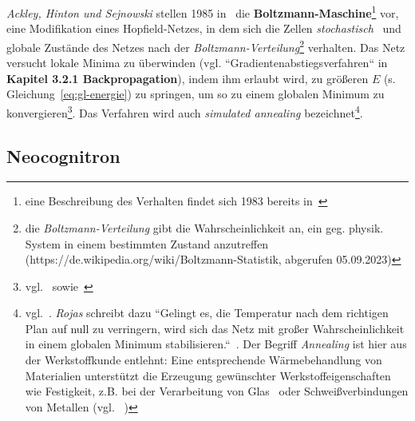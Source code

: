 \textit{Ackley, Hinton und Sejnowski} stellen 1985 in~\cite{AHS85} die \textbf{Boltzmann-Maschine}\footnote{
    eine Beschreibung des Verhalten findet sich 1983 bereits in~\cite{HS83}
} vor, eine Modifikation eines Hopfield-Netzes, in dem sich die Zellen \textit{stochastisch}~\cite[635]{AR88} und globale Zustände des Netzes nach der \textit{Boltzmann-Verteilung}\footnote{
    die \textit{Boltzmann-Verteilung} gibt die Wahrscheinlichkeit an, ein geg. physik. System in einem bestimmten Zustand anzutreffen (https://de.wikipedia.org/wiki/Boltzmann-Statistik, abgerufen  05.09.2023)
} verhalten. Das Netz versucht lokale Minima zu überwinden (vgl. ``Gradientenabstiegsverfahren`` in \textbf{Kapitel 3.2.1 Backpropagation}), indem ihm erlaubt wird, zu größeren $E$ (s. Gleichung~\ref{eq:gl-energie}) zu springen, um so zu einem globalen Minimum zu konvergieren\footnote{
    vgl.~\cite[151]{AHS85} sowie~\cite[107]{Koh90}
}.
Das Verfahren wird auch \textit{simulated annealing} bezeichnet\footnote{vgl.~\cite[297]{Ert21b}. \textit{Rojas} schreibt dazu
    ``Gelingt es, die Temperatur nach dem richtigen Plan auf null zu verringern, wird sich das Netz mit großer Wahrscheinlichkeit in einem globalen Minimum stabilisieren.``~\cite[322]{Roj93}. Der Begriff \textit{Annealing} ist hier aus der Werkstoffkunde entlehnt: Eine entsprechende Wärmebehandlung von Materialien unterstützt die Erzeugung gewünschter Werkstoffeigenschaften wie Festigkeit, z.B.  bei der Verarbeitung von Glas~\cite[3]{Jeb11} oder Schweißverbindungen von Metallen (vgl. ~\cite{FJOA19})
}.

\subsection{Neocognitron}

